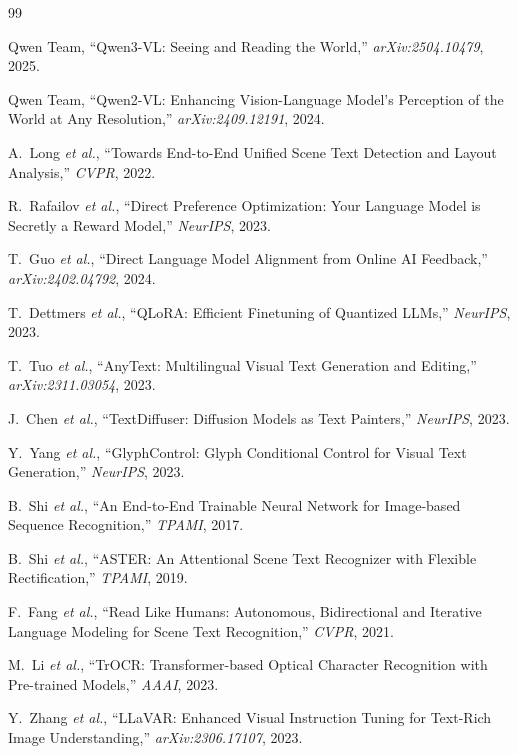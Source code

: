 \documentclass[uplatex,10pt,twocolumn,a4paper]{article}
\newcommand{\etal}{\textit{et al.}}
\begin{document}

\begin{thebibliography}{99}

Qwen Team,
``Qwen3-VL: Seeing and Reading the World,''
\textit{arXiv:2504.10479}, 2025.

Qwen Team,
``Qwen2-VL: Enhancing Vision-Language Model's Perception of the World
at Any Resolution,''
\textit{arXiv:2409.12191}, 2024.

A.~Long \etal,
``Towards End-to-End Unified Scene Text Detection and Layout Analysis,''
\textit{CVPR}, 2022.

R.~Rafailov \etal,
``Direct Preference Optimization: Your Language Model is Secretly a
Reward Model,''
\textit{NeurIPS}, 2023.

T.~Guo \etal,
``Direct Language Model Alignment from Online AI Feedback,''
\textit{arXiv:2402.04792}, 2024.

T.~Dettmers \etal,
``QLoRA: Efficient Finetuning of Quantized LLMs,''
\textit{NeurIPS}, 2023.

T.~Tuo \etal,
``AnyText: Multilingual Visual Text Generation and Editing,''
\textit{arXiv:2311.03054}, 2023.

J.~Chen \etal,
``TextDiffuser: Diffusion Models as Text Painters,''
\textit{NeurIPS}, 2023.

Y.~Yang \etal,
``GlyphControl: Glyph Conditional Control for Visual Text Generation,''
\textit{NeurIPS}, 2023.

B.~Shi \etal,
``An End-to-End Trainable Neural Network for Image-based Sequence
Recognition,''
\textit{TPAMI}, 2017.

B.~Shi \etal,
``ASTER: An Attentional Scene Text Recognizer with Flexible
Rectification,''
\textit{TPAMI}, 2019.

F.~Fang \etal,
``Read Like Humans: Autonomous, Bidirectional and Iterative Language
Modeling for Scene Text Recognition,''
\textit{CVPR}, 2021.

M.~Li \etal,
``TrOCR: Transformer-based Optical Character Recognition with
Pre-trained Models,''
\textit{AAAI}, 2023.

Y.~Zhang \etal,
``LLaVAR: Enhanced Visual Instruction Tuning for Text-Rich Image
Understanding,''
\textit{arXiv:2306.17107}, 2023.


\end{thebibliography}
\end{document}
